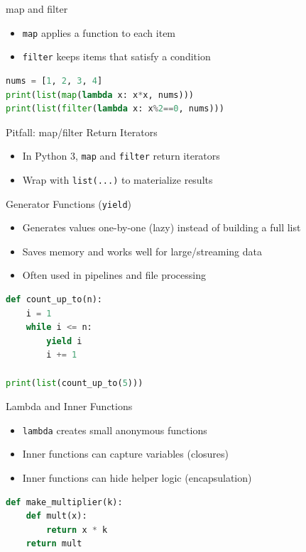 \documentclass{beamer}
\begin{document}
\begin{frame}[fragile]{map and filter}
  \begin{itemize}[<+->]
    \item \texttt{map} applies a function to each item
    \item \texttt{filter} keeps items that satisfy a condition
  \end{itemize}
  \vspace{0.4em}
  \begin{lstlisting}[language=Python]
nums = [1, 2, 3, 4]
print(list(map(lambda x: x*x, nums)))
print(list(filter(lambda x: x%2==0, nums)))
  \end{lstlisting}
\end{frame}

\begin{frame}[fragile]{Pitfall: map/filter Return Iterators}
  \begin{itemize}[<+->]
    \item In Python 3, \texttt{map} and \texttt{filter} return iterators
    \item Wrap with \texttt{list(...)} to materialize results
  \end{itemize}
\end{frame}

\begin{frame}[fragile]{Generator Functions (\texttt{yield})}
  \begin{itemize}[<+->]
    \item Generates values one-by-one (lazy) instead of building a full list
    \item Saves memory and works well for large/streaming data
    \item Often used in pipelines and file processing
  \end{itemize}
  \vspace{0.4em}
  \begin{lstlisting}[language=Python]
def count_up_to(n):
    i = 1
    while i <= n:
        yield i
        i += 1

print(list(count_up_to(5)))
  \end{lstlisting}
\end{frame}

\begin{frame}[fragile]{Lambda and Inner Functions}
  \begin{itemize}[<+->]
    \item \texttt{lambda} creates small anonymous functions
    \item Inner functions can capture variables (closures)
    \item Inner functions can hide helper logic (encapsulation)
  \end{itemize}
  \vspace{0.4em}
  \begin{lstlisting}[language=Python]
def make_multiplier(k):
    def mult(x):
        return x * k
    return mult
  \end{lstlisting}
\end{frame}
\end{document}

